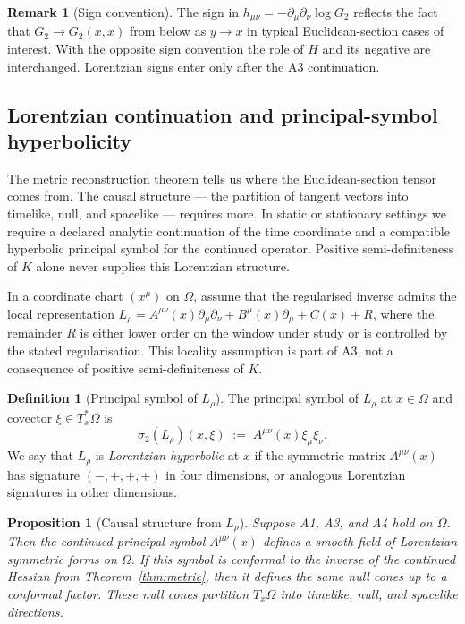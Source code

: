 ﻿\documentclass[12pt,a4paper]{article}
\newtheorem{proposition}[theorem]{Proposition}
\theoremstyle{definition}
\newtheorem{definition}[theorem]{Definition}
\newtheorem{remark}[theorem]{Remark}
\begin{document}
\begin{remark}[Sign convention]
The sign in $h_{\mu\nu} = -\partial_\mu\partial_\nu \log G_2$ reflects the fact that $G_2 \to G_2(x,x)$ from below as $y \to x$ in typical Euclidean-section cases of interest. With the opposite sign convention the role of $H$ and its negative are interchanged. Lorentzian signs enter only after the A3 continuation.
\end{remark}

\subsection{Lorentzian continuation and principal-symbol hyperbolicity}
\label{sec:causal_structure}

The metric reconstruction theorem tells us where the Euclidean-section tensor comes from. The causal structure --- the partition of tangent vectors into timelike, null, and spacelike --- requires more. In static or stationary settings we require a declared analytic continuation of the time coordinate and a compatible hyperbolic principal symbol for the continued operator. Positive semi-definiteness of $K$ alone never supplies this Lorentzian structure.

In a coordinate chart $(x^\mu)$ on $\Omega$, assume that the regularised inverse admits the local representation $L_\rho = A^{\mu\nu}(x) \partial_\mu \partial_\nu + B^\mu(x) \partial_\mu + C(x) + R$, where the remainder $R$ is either lower order on the window under study or is controlled by the stated regularisation. This locality assumption is part of A3, not a consequence of positive semi-definiteness of $K$.

\begin{definition}[Principal symbol of $L_\rho$]
The principal symbol of $L_\rho$ at $x \in \Omega$ and covector $\xi \in T^*_x\Omega$ is
\[
\sigma_2(L_\rho)(x,\xi) \;:=\; A^{\mu\nu}(x) \xi_\mu \xi_\nu.
\]
We say that $L_\rho$ is \emph{Lorentzian hyperbolic} at $x$ if the symmetric matrix $A^{\mu\nu}(x)$ has signature $(-,+,+,+)$ in four dimensions, or analogous Lorentzian signatures in other dimensions.
\end{definition}

\begin{proposition}[Causal structure from $L_\rho$]
\label{prop:causal}
Suppose A1, A3, and A4 hold on $\Omega$. Then the continued principal symbol $A^{\mu\nu}(x)$ defines a smooth field of Lorentzian symmetric forms on $\Omega$. If this symbol is conformal to the inverse of the continued Hessian from Theorem~\ref{thm:metric}, then it defines the same null cones up to a conformal factor. These null cones partition $T_x\Omega$ into timelike, null, and spacelike directions.
\end{proposition}
\end{document}
